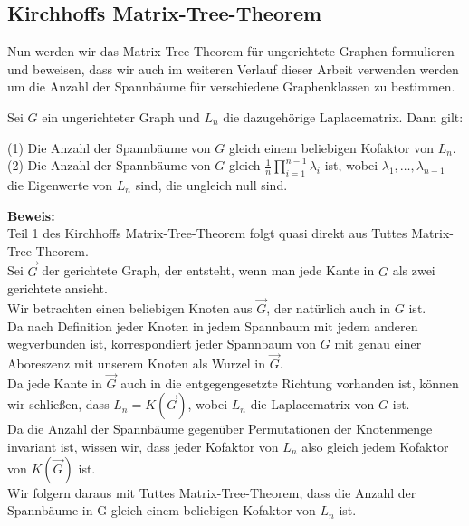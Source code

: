 \subsection{Kirchhoffs Matrix-Tree-Theorem}
Nun werden wir das Matrix-Tree-Theorem für ungerichtete Graphen formulieren und beweisen, dass wir auch im weiteren Verlauf dieser Arbeit verwenden werden um die Anzahl der Spannbäume für verschiedene Graphenklassen zu bestimmen.
\begin{Tms}
Sei $G$ ein ungerichteter Graph und $L_n$  die dazugehörige Laplacematrix. 
Dann gilt:
\par
\begingroup
\leftskip=20pt%
\rightskip=20pt
\noindent %
(1) Die Anzahl der Spannbäume von $G$ gleich einem beliebigen Kofaktor von $L_n$.\\
(2) Die Anzahl der Spannbäume von $G$ gleich $\frac{1}{n}\prod_{i=1}^{n-1}\lambda_i$ ist, wobei $\lambda_1,\ldots,\lambda_{n-1}$ die Eigenwerte von $L_n$ sind, die ungleich null sind.
\par
\endgroup
\end{Tms}
\textbf{Beweis:}\\
Teil 1 des Kirchhoffs Matrix-Tree-Theorem folgt quasi direkt aus Tuttes Matrix-Tree-Theorem. \\
Sei $\vec{G}$ der gerichtete Graph, der entsteht, wenn man jede Kante in $G$ als zwei gerichtete ansieht.\\
Wir betrachten einen beliebigen Knoten aus $\vec{G}$, der natürlich auch in $G$ ist. \\
Da nach Definition jeder Knoten in jedem Spannbaum mit jedem anderen wegverbunden ist, korrespondiert jeder Spannbaum von $G$ mit genau einer Aboreszenz mit unserem Knoten als Wurzel in $\vec{G}$. \\
Da jede Kante in $\vec{G}$ auch in die entgegengesetzte Richtung vorhanden ist, können wir schließen, dass $L_n=K(\vec{G})$, wobei $L_n$ die Laplacematrix von $G$ ist. \\
Da die Anzahl der Spannbäume gegenüber Permutationen der Knotenmenge invariant ist, wissen wir, dass jeder Kofaktor von $L_n$ also gleich jedem Kofaktor von $K(\vec{G})$ ist.\\
Wir folgern daraus mit Tuttes Matrix-Tree-Theorem, dass die Anzahl der Spannbäume in G gleich einem beliebigen Kofaktor von $L_n$ ist.\\ \\
